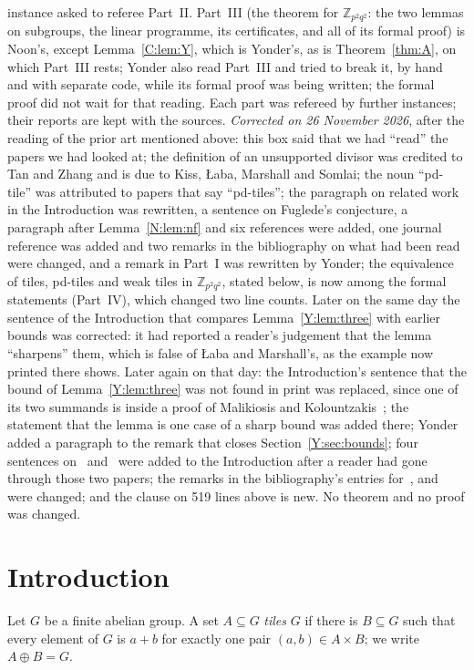 \documentclass[11pt,a4paper]{amsart}
\theoremstyle{definition}
\theoremstyle{remark}
\newcommand{\Z}{\mathbb{Z}}
\begin{document}
{{instance asked to referee Part~II. Part~III (the theorem for $\Z_{p^2q^2}$: the two lemmas on subgroups, the
linear programme, its certificates, and all of its formal proof) is Noon's, except Lemma~\ref{C:lem:Y}, which is
Yonder's, as is Theorem~\ref{thm:A}, on which Part~III rests; Yonder also read Part~III and tried to break it,
by hand and with separate code, while its formal proof was being written; the formal proof did not wait for that reading. Each part was refereed by further instances; their reports are kept with the
sources. \emph{Corrected on 26 November 2026}, after the reading of the prior art mentioned above: this box said that we had ``read'' the papers we had looked at; the definition of an unsupported divisor was credited to Tan and Zhang and is due to Kiss, {\L}aba, Marshall and Somlai; the noun ``pd-tile'' was attributed to papers that say ``pd-tiles''; the paragraph on related work in the Introduction was rewritten, a sentence on Fuglede's conjecture, a paragraph after Lemma~\ref{N:lem:nf} and six references were added, one journal reference was added and two remarks in the bibliography on what had been read were changed, and a remark in Part~I was rewritten by Yonder; the equivalence of tiles, pd-tiles and weak tiles in $\Z_{p^2q^2}$, stated below, is now among the formal statements (Part~IV), which changed two line counts. Later on the same day the sentence of the Introduction that compares Lemma~\ref{Y:lem:three} with earlier bounds was corrected: it had reported a reader's judgement that the lemma ``sharpens'' them, which is false of {\L}aba and Marshall's, as the example now printed there shows. Later again on that day: the Introduction's sentence that the bound of Lemma~\ref{Y:lem:three} was not found in print was replaced, since one of its two summands is inside a proof of Malikiosis and Kolountzakis~\cite{MK}; the statement that the lemma is one case of a sharp bound was added there; Yonder added a paragraph to the remark that closes Section~\ref{Y:sec:bounds}; four sentences on~\cite{Mal} and~\cite{KMSV} were added to the Introduction after a reader had gone through those two papers; the remarks in the bibliography's entries for~\cite{MK}, \cite{Mal} and~\cite{KMSV} were changed; and the clause on 519 lines above is new. No theorem and no proof was changed.}}

\section{Introduction}

Let $G$ be a finite abelian group. A set $A\subseteq G$ \emph{tiles} $G$ if there is $B\subseteq G$ such that
every element of $G$ is $a+b$ for exactly one pair $(a,b)\in A\times B$; we write $A\oplus B=G$.
\end{document}
